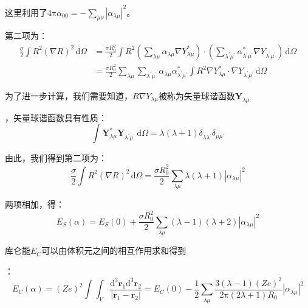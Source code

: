 \begin{booknote*}
这里利用了$4\mathrm{\pi}\alpha_{00}=-\sum_{\mu\nu}\left|\alpha_{\lambda\mu}\right|^{2}$。

第二项为：
\begin{align*}
\frac{\sigma}{2}\int R^{2}(\nabla R)^{2}\,\mathrm{d}\Omega & =\frac{\sigma R^{2}_{0}}{2}\int R^{2}(\sum_{\lambda\mu}\alpha_{\lambda\mu}\nabla Y^{*}_{\lambda\mu})\cdot(\sum_{\lambda^{\prime}\mu^{\prime}}\alpha^{*}_{\lambda^{\prime}\mu^{\prime}}\nabla Y_{\lambda^{\prime}\mu^{\prime}})\,\mathrm{d}\Omega\\
 & =\frac{\sigma R^{2}_{0}}{2}\sum_{\lambda\mu}\sum_{\lambda^{\prime}\mu^{\prime}}\alpha_{\lambda\mu}\alpha^{*}_{\lambda^{\prime}\mu^{\prime}}\int R^{2}\nabla Y^{*}_{\lambda\mu}\cdot\nabla Y_{\lambda^{\prime}\mu^{\prime}}\,\mathrm{d}\Omega
\end{align*}

为了进一步计算，我们需要知道，$R\nabla Y_{\lambda\mu}$被称为矢量球谐函数$\boldsymbol{Y}_{\lambda\mu}$

，矢量球谐函数具有性质：
\[
\int\boldsymbol{Y}^{*}_{\lambda\mu}\boldsymbol{Y}_{\lambda^{\prime}\mu^{\prime}}\,\mathrm{d}\Omega=\lambda(\lambda+1)\delta_{\lambda\lambda^{\prime}}\delta_{\mu\mu^{\prime}}
\]

由此，我们得到第二项为：
\[
\frac{\sigma}{2}\int R^{2}(\nabla R)^{2}\,\mathrm{d}\Omega=\frac{\sigma R^{2}_{0}}{2}\sum_{\lambda\mu}\lambda(\lambda+1)\left|\alpha_{\lambda\mu}\right|^{2}
\]

两项相加，得：
\[
E_{S}(\alpha)=E_{S}(0)+\frac{\sigma R^{2}_{0}}{2}\sum_{\lambda\mu}(\lambda-1)(\lambda+2)\left|\alpha_{\lambda\mu}\right|^{2}
\]
\end{booknote*}
库仑能$E_{C}$可以由体积元之间的相互作用求和得到

：
\[
E_{C}(\alpha)=(Ze)^{2}\int\int_{V}\frac{\mathrm{d}^{3}\boldsymbol{r}_{1}\mathrm{d}^{3}\boldsymbol{r}_{2}}{\left|\boldsymbol{r}_{1}-\boldsymbol{r}_{2}\right|}=E_{C}(0)-\frac{1}{2}\sum_{\lambda\mu}\frac{3(\lambda-1)(Ze)^{2}}{2\mathrm{\pi}(2\lambda+1)R_{0}}\left|\alpha_{\lambda\mu}\right|^{2}
\]

